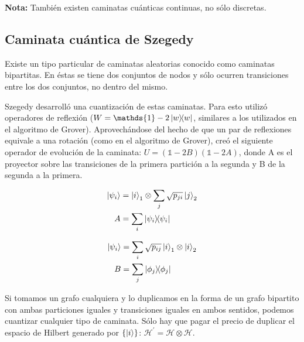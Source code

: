 \documentclass[11pt, spanish]{report}
\begin{document}
\textbf{Nota:} También existen caminatas cuánticas continuas, no sólo discretas.

\subsection{Caminata cuántica de Szegedy}

Existe un tipo particular de caminatas aleatorias conocido como caminatas bipartitas. En éstas se tiene dos conjuntos de nodos y sólo ocurren transiciones entre los dos conjuntos, no dentro del mismo.


Szegedy desarrolló una cuantización de estas caminatas. Para esto utilizó operadores de reflexión ($W = \mathds{1} - 2 \ketbra{w}{w}$, similares a los utilizados en el algoritmo de Grover). Aprovechándose del hecho de que un par de reflexiones equivale a una rotación (como en el algoritmo de Grover), creó el siguiente operador de evolución de la caminata: $U = (\mathds{1} - 2 B)(\mathds{1} - 2 A)$, donde A es el proyector sobre las transiciones de la primera partición a la segunda y B de la segunda a la primera.

\begin{minipage}{0.5\linewidth}
\begin{align*}
\ket{\psi_i} &= \ket{i}_1 \otimes \sum\limits_j \sqrt{p_{j i}} \ket{j}_2 \\
A &= \sum\limits_i \ketbra{\psi_i}{\psi_i}
\end{align*}
\end{minipage}
\begin{minipage}{0.5\linewidth}
\begin{align*}
\ket{\psi_i} &= \sum\limits_i \sqrt{p_{i j}} \ket{i}_1 \otimes \ket{i}_2 \\
B &= \sum\limits_j \ketbra{\phi_j}{\phi_j}
\end{align*}
\end{minipage}

Si tomamos un grafo cualquiera y lo duplicamos en la forma de un grafo bipartito con ambas particiones iguales y transiciones iguales en ambos sentidos, podemos cuantizar cualquier tipo de caminata. Sólo hay que pagar el precio de duplicar el espacio de Hilbert generado por $\{\ket{i}\}$: $\mathcal{H}^\prime = \mathcal{H} \otimes \mathcal{H}$.
\end{document}

